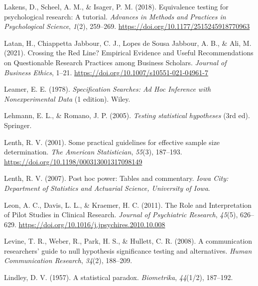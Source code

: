 \documentclass[
  letterpaper,
  DIV=11,
  numbers=noendperiod]{scrreprt}
\newlength{\cslhangindent}
\newlength{\cslentryspacingunit} %
\newenvironment{CSLReferences}[2] %
 {%
  \setlength{\parindent}{0pt}
  \ifodd #1
  \let\oldpar\par
  \def\par{\hangindent=\cslhangindent\oldpar}
  \fi
  \setlength{\parskip}{#2\cslentryspacingunit}
 }%
 {}
\begin{document}
\begin{CSLReferences}{1}{0}
\leavevmode{}%
Lakens, D., Scheel, A. M., \& Isager, P. M. (2018). Equivalence testing
for psychological research: {A} tutorial. \emph{Advances in Methods and
Practices in Psychological Science}, \emph{1}(2), 259--269.
\url{https://doi.org/10.1177/2515245918770963}

\leavevmode{}%
Latan, H., Chiappetta Jabbour, C. J., Lopes de Sousa Jabbour, A. B., \&
Ali, M. (2021). Crossing the {Red Line}? {Empirical Evidence} and
{Useful Recommendations} on {Questionable Research Practices} among
{Business Scholars}. \emph{Journal of Business Ethics}, 1--21.
\url{https://doi.org/10.1007/s10551-021-04961-7}

\leavevmode{}%
Leamer, E. E. (1978). \emph{Specification {Searches}: {Ad Hoc Inference}
with {Nonexperimental Data}} (1 edition). {Wiley}.

\leavevmode{}%
Lehmann, E. L., \& Romano, J. P. (2005). \emph{Testing statistical
hypotheses} (3rd ed). {Springer}.

\leavevmode{}%
Lenth, R. V. (2001). Some practical guidelines for effective sample size
determination. \emph{The American Statistician}, \emph{55}(3), 187--193.
\url{https://doi.org/10.1198/000313001317098149}

\leavevmode{}%
Lenth, R. V. (2007). Post hoc power: Tables and commentary. \emph{Iowa
City: Department of Statistics and Actuarial Science, University of
Iowa}.

\leavevmode{}%
Leon, A. C., Davis, L. L., \& Kraemer, H. C. (2011). The {Role} and
{Interpretation} of {Pilot Studies} in {Clinical Research}.
\emph{Journal of Psychiatric Research}, \emph{45}(5), 626--629.
\url{https://doi.org/10.1016/j.jpsychires.2010.10.008}

\leavevmode{}%
Levine, T. R., Weber, R., Park, H. S., \& Hullett, C. R. (2008). A
communication researchers' guide to null hypothesis significance testing
and alternatives. \emph{Human Communication Research}, \emph{34}(2),
188--209.

\leavevmode{}%
Lindley, D. V. (1957). A statistical paradox. \emph{Biometrika},
\emph{44}(1/2), 187--192.


\end{CSLReferences}
\end{document}
